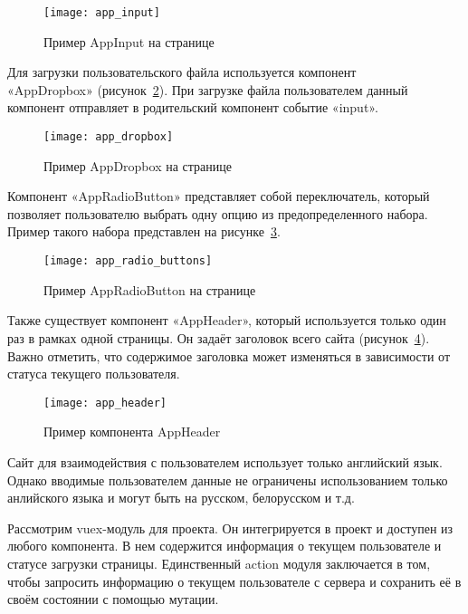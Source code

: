 \begin{figure}[h]
    \centering
    \texttt{[image: app\_input]}
    \caption{Пример AppInput на странице}\label{fig:app_input}
\end{figure}

Для загрузки пользовательского файла используется компонент \\«AppDropbox» (рисунок~\ref{fig:app_dropbox}). При загрузке файла пользователем данный компонент отправляет в родительский компонент событие «input».

\begin{figure}[h]
    \centering
    \texttt{[image: app\_dropbox]}
    \caption{Пример AppDropbox на странице}\label{fig:app_dropbox}
\end{figure}

Компонент «AppRadioButton» представляет собой переключатель, который позволяет пользователю выбрать одну опцию из предопределенного набора. Пример такого набора представлен на рисунке~\ref{fig:app_radio_buttons}.

\begin{figure}[h]
    \centering
    \texttt{[image: app\_radio\_buttons]}
    \caption{Пример AppRadioButton на странице}\label{fig:app_radio_buttons}
\end{figure}

Также существует компонент «AppHeader», который используется только один раз в рамках одной страницы. Он задаёт заголовок всего сайта (рисунок~\ref{fig:app_header}). Важно отметить, что содержимое заголовка может изменяться в зависимости от статуса текущего пользователя.

\begin{figure}[h]
    \centering
    \texttt{[image: app\_header]}
    \caption{Пример компонента AppHeader}\label{fig:app_header}
\end{figure}

Сайт для взаимодействия с пользователем использует только английский язык. Однако вводимые пользователем данные не ограничены использованием только анлийского языка и могут быть на русском, белорусском и т.д.

Рассмотрим vuex-модуль для проекта. Он интегрируется в проект и доступен из любого компонента. В нем содержится информация о текущем пользователе и статусе загрузки страницы. Единственный action модуля заключается в том, чтобы запросить информацию о текущем пользователе с сервера и сохранить её в своём состоянии с помощью мутации.

